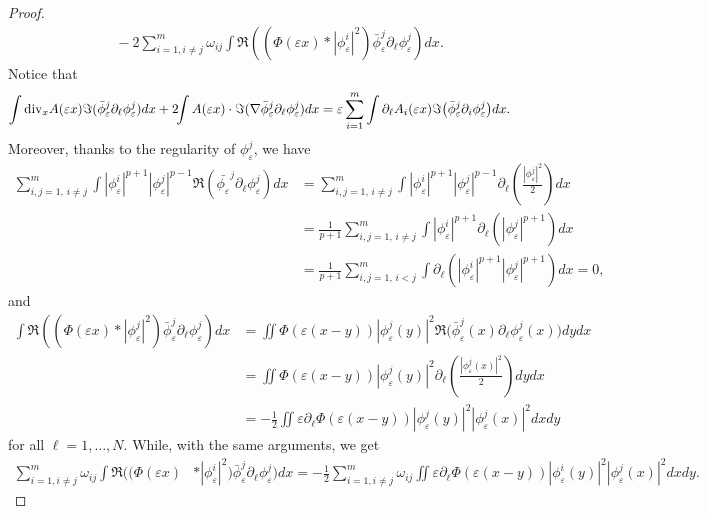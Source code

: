 \documentclass[11pt]{amsart}
\numberwithin{equation}{section}
\theoremstyle{definition}
\begin{document}
\begin{proof}
$$\begin{aligned}
& \qquad - 2\sum_{i=1, i\not = j}^m\omega_{ij}
\int{{\Re}}\left((\Phi({\varepsilon} x)*|\phi_{\varepsilon}^i|^2)\bar
\phi_{\varepsilon}^j\partial_\ell\phi_{\varepsilon}^j\right)dx.
\end{aligned}$$
Notice that
$$
\int {\rm div}_xA({\varepsilon}
x){{\Im}}(\bar\phi_{\varepsilon}^j\partial_\ell\phi_{\varepsilon}^j)dx+ 2\!\!\int A({\varepsilon}
x)\cdot{{\Im}}(\nabla \bar\phi_{\varepsilon}^j\partial_\ell\phi_{\varepsilon}^j)dx={\varepsilon}
\sum_{i=1}^m \int
\partial_\ell A_i({\varepsilon} x){{\Im}}\big(\bar\phi_{\varepsilon}^j\partial_i\phi_{\varepsilon}^j\big)dx.
$$
Moreover, thanks to the regularity of $\phi_{\varepsilon}^j$, we have
$$
\begin{aligned}
\sum_{i,j=1,\, i\neq j}^{m}\int |\phi_{\varepsilon}^i|^{p+1}|\phi_{\varepsilon}^j|^{p-1}{{\Re}}(\bar{\phi_{\varepsilon}}^j\partial_\ell\phi_{\varepsilon}^j)dx
& = \sum_{i,j=1,\, i\neq j}^{m}\int |\phi_{\varepsilon}^i|^{p+1}|\phi_{\varepsilon}^j|^{p-1}\partial_\ell\left(\frac{|\phi_{\varepsilon}^j|^2}{2}\right)dx\\
& = \frac{1}{p+1}\sum_{i,j=1,\, i\neq j}^{m}\int |\phi_{\varepsilon}^i|^{p+1}\partial_\ell\left(|\phi_{\varepsilon}^j|^{p+1}\right)dx\\
& = \frac{1}{p+1}\sum_{i,j=1,\, i<j}^{m}\int
\partial_\ell\left(|\phi_{\varepsilon}^i|^{p+1}|\phi_{\varepsilon}^j|^{p+1}\right)dx=0,
\end{aligned}$$
and
$$\begin{aligned}
\int{{\Re}}\left((\Phi({\varepsilon} x)*|\phi_{\varepsilon}^j|^2)\bar
\phi_{\varepsilon}^j\partial_\ell\phi_{\varepsilon}^j\right)dx
& =\iint \Phi({\varepsilon}(x-y))|\phi_{\varepsilon}^j(y)|^2{{\Re}}\big(\bar\phi_{\varepsilon}^j(x)\partial_\ell\phi_{\varepsilon}^j(x)\big)dy dx\\
& = \iint \Phi({\varepsilon}(x-y))|\phi_{\varepsilon}^j(y)|^2\partial_\ell\left(\frac{|\phi_{\varepsilon}^j(x)|^2}{2}\right)dy dx\\
& =- \frac 1 2\iint
{\varepsilon}\partial_\ell\Phi({\varepsilon}(x-y))|\phi_{\varepsilon}^j(y)|^2|\phi_{\varepsilon}^j(x)|^2dxdy
\end{aligned}$$
for all $\ell=1, \dots, N$. While, with the same arguments, we get
$$\begin{aligned}
\sum_{i=1, i\not =
j}^m\omega_{ij}\int{{\Re}}\big((\Phi({\varepsilon} x)&*|\phi_{\varepsilon}^i|^2)\bar
\phi_{\varepsilon}^j\partial_\ell\phi_{\varepsilon}^j\big)dx =- \frac 1 2\sum_{i=1,
i\not = j}^m\omega_{ij}\iint
{\varepsilon}\partial_\ell\Phi({\varepsilon}(x-y))|\phi_{\varepsilon}^i(y)|^2|\phi_{\varepsilon}^j(x)|^2dxdy.

\end{aligned}$$
\end{proof}
\end{document}
